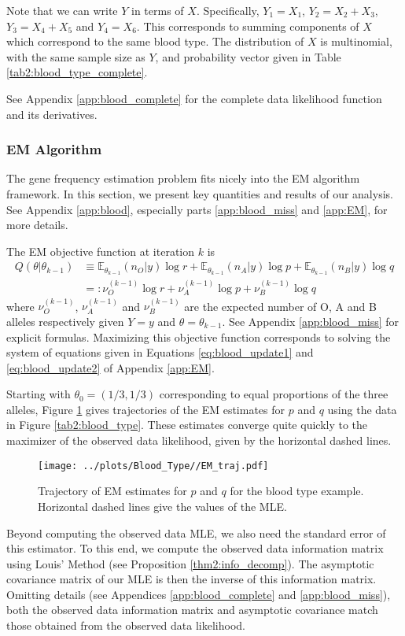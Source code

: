 \documentclass[11pt, oneside]{article}   	%
\newcommand{\bE}{\mathbb{E}}
\begin{document}
Note that we can write $Y$ in terms of $X$. Specifically, $Y_1 = X_1$, $Y_2 = X_2 + X_3$, $Y_3 = X_4 + X_5$ and $Y_4 = X_6$. This corresponds to summing components of $X$ which correspond to the same blood type. The distribution of $X$ is multinomial, with the same sample size as $Y$, and probability vector given in Table \ref{tab2:blood_type_complete}.

See Appendix \ref{app:blood_complete} for the complete data likelihood function and its derivatives.

\subsubsection{EM Algorithm}

The gene frequency estimation problem fits nicely into the EM algorithm framework. In this section, we present key quantities and results of our analysis. See Appendix \ref{app:blood}, especially parts \ref{app:blood_miss} and \ref{app:EM}, for more details.

The EM objective function at iteration $k$ is
%
\begin{align}
    Q(\theta|\theta_{k-1}) &\equiv  \bE_{\theta_{k-1}}(n_O | y) \log r + \bE_{\theta_{k-1}}(n_A | y) \log p + \bE_{\theta_{k-1}}(n_B | y) \log q\\
    &=: \nu^{(k-1)}_O \log r + \nu^{(k-1)}_A \log p + \nu^{(k-1)}_B \log q
\end{align}
%
where $\nu^{(k-1)}_O$, $\nu^{(k-1)}_A$ and $\nu^{(k-1)}_B$ are the expected number of O, A and B alleles respectively given $Y=y$ and $\theta = \theta_{k-1}$. See Appendix \ref{app:blood_miss} for explicit formulas. Maximizing this objective function corresponds to solving the system of equations given in Equations \ref{eq:blood_update1} and \ref{eq:blood_update2} of Appendix \ref{app:EM}.

Starting with $\theta_0 = (1/3, 1/3)$ corresponding to equal proportions of the three alleles, Figure \ref{fig2:blood_EM_traj} gives trajectories of the EM estimates for $p$ and $q$ using the data in Figure \ref{tab2:blood_type}. These estimates converge quite quickly to the maximizer of the observed data likelihood, given by the horizontal dashed lines.
%
\begin{figure}
    \centering
    \caption{Trajectory of EM estimates for $p$ and $q$ for the blood type example. Horizontal dashed lines give the values of the MLE.}
    \label{fig2:blood_EM_traj}
    \texttt{[image: ../plots/Blood\_Type//EM\_traj.pdf]}
\end{figure}
%
Beyond computing the observed data MLE, we also need the standard error of this estimator. To this end, we compute the observed data information matrix using Louis' Method (see Proposition \ref{thm2:info_decomp}). The asymptotic covariance matrix of our MLE is then the inverse of this information matrix. Omitting details (see Appendices \ref{app:blood_complete} and \ref{app:blood_miss}), both the observed data information matrix and asymptotic covariance match those obtained from the observed data likelihood. 
%
\end{document}
